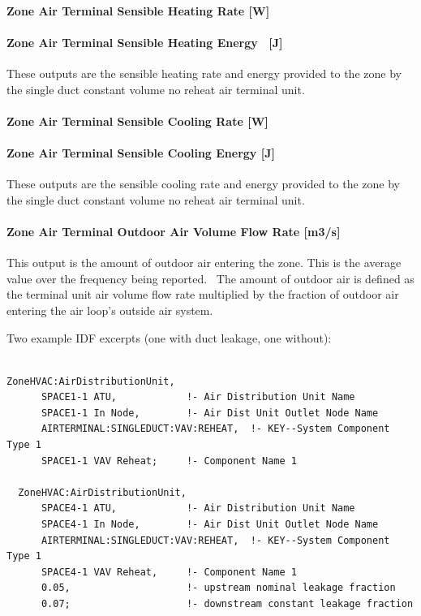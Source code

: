 \paragraph{Zone Air Terminal Sensible Heating Rate {[}W{]}}\label{zone-air-terminal-sensible-heating-rate-w}

\paragraph{Zone Air Terminal Sensible Heating Energy~ {[}J{]}}\label{zone-air-terminal-sensible-heating-energy-j}

These outputs are the sensible heating rate and energy provided to the zone by the single duct constant volume no reheat air terminal unit.

\paragraph{Zone Air Terminal Sensible Cooling Rate {[}W{]}}\label{zone-air-terminal-sensible-cooling-rate-w}

\paragraph{Zone Air Terminal Sensible Cooling Energy {[}J{]}}\label{zone-air-terminal-sensible-cooling-energy-j}

These outputs are the sensible cooling rate and energy provided to the zone by the single duct constant volume no reheat air terminal unit.

\paragraph{Zone Air Terminal Outdoor Air Volume Flow Rate {[}m3/s{]}}\label{zone-air-terminal-outdoor-air-volume-flow-rate-m3s}

This output is the amount of outdoor air entering the zone. This is the average value over the frequency being reported.~ The amount of outdoor air is defined as the terminal unit air volume flow rate multiplied by the fraction of outdoor air entering the air loop's outside air system.

Two example IDF excerpts (one with duct leakage, one without):

\begin{lstlisting}

ZoneHVAC:AirDistributionUnit,
      SPACE1-1 ATU,            !- Air Distribution Unit Name
      SPACE1-1 In Node,        !- Air Dist Unit Outlet Node Name
      AIRTERMINAL:SINGLEDUCT:VAV:REHEAT,  !- KEY--System Component Type 1
      SPACE1-1 VAV Reheat;     !- Component Name 1

  ZoneHVAC:AirDistributionUnit,
      SPACE4-1 ATU,            !- Air Distribution Unit Name
      SPACE4-1 In Node,        !- Air Dist Unit Outlet Node Name
      AIRTERMINAL:SINGLEDUCT:VAV:REHEAT,  !- KEY--System Component Type 1
      SPACE4-1 VAV Reheat,     !- Component Name 1
      0.05,                    !- upstream nominal leakage fraction
      0.07;                    !- downstream constant leakage fraction
\end{lstlisting}

